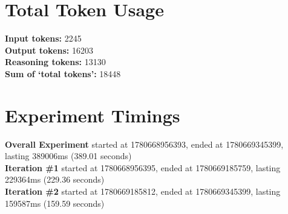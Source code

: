 \documentclass{article}
\begin{document}
\section*{Total Token Usage}
\textbf{Input tokens: }2245
\\\textbf{Output tokens: }16203
\\\textbf{Reasoning tokens: }13130
\\\textbf{Sum of `total tokens': }18448
\section*{Experiment Timings}
\textbf{Overall Experiment} started at 1780668956393, ended at 1780669345399, lasting 389006ms (389.01 seconds)
\\\textbf{Iteration \#1} started at 1780668956395, ended at 1780669185759, lasting 229364ms (229.36 seconds)
\\\textbf{Iteration \#2} started at 1780669185812, ended at 1780669345399, lasting 159587ms (159.59 seconds)
\end{document}
